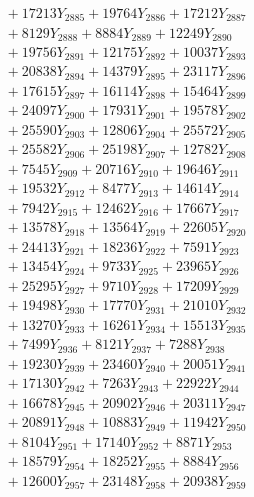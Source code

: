 \documentclass[a4paper,10pt]{article}
\begin{document}
{\begin{align}
&\;  + 17213 Y_{2885} + 19764 Y_{2886} + 17212 Y_{2887} \\[0.3ex]
&\;  + 8129 Y_{2888} + 8884 Y_{2889} + 12249 Y_{2890} \\[0.3ex]
&\;  + 19756 Y_{2891} + 12175 Y_{2892} + 10037 Y_{2893} \\[0.3ex]
&\;  + 20838 Y_{2894} + 14379 Y_{2895} + 23117 Y_{2896} \\[0.3ex]
&\;  + 17615 Y_{2897} + 16114 Y_{2898} + 15464 Y_{2899} \\[0.3ex]
&\;  + 24097 Y_{2900} + 17931 Y_{2901} + 19578 Y_{2902} \\[0.3ex]
&\;  + 25590 Y_{2903} + 12806 Y_{2904} + 25572 Y_{2905} \\[0.3ex]
&\;  + 25582 Y_{2906} + 25198 Y_{2907} + 12782 Y_{2908} \\[0.5ex]\allowbreak
&\;  + 7545 Y_{2909} + 20716 Y_{2910} + 19646 Y_{2911} \\[0.3ex]
&\;  + 19532 Y_{2912} + 8477 Y_{2913} + 14614 Y_{2914} \\[0.3ex]
&\;  + 7942 Y_{2915} + 12462 Y_{2916} + 17667 Y_{2917} \\[0.3ex]
&\;  + 13578 Y_{2918} + 13564 Y_{2919} + 22605 Y_{2920} \\[0.3ex]
&\;  + 24413 Y_{2921} + 18236 Y_{2922} + 7591 Y_{2923} \\[0.3ex]
&\;  + 13454 Y_{2924} + 9733 Y_{2925} + 23965 Y_{2926} \\[0.3ex]
&\;  + 25295 Y_{2927} + 9710 Y_{2928} + 17209 Y_{2929} \\[0.3ex]
&\;  + 19498 Y_{2930} + 17770 Y_{2931} + 21010 Y_{2932} \\[0.3ex]
&\;  + 13270 Y_{2933} + 16261 Y_{2934} + 15513 Y_{2935} \\[0.3ex]
&\;  + 7499 Y_{2936} + 8121 Y_{2937} + 7288 Y_{2938} \\[0.5ex]\allowbreak
&\;  + 19230 Y_{2939} + 23460 Y_{2940} + 20051 Y_{2941} \\[0.3ex]
&\;  + 17130 Y_{2942} + 7263 Y_{2943} + 22922 Y_{2944} \\[0.3ex]
&\;  + 16678 Y_{2945} + 20902 Y_{2946} + 20311 Y_{2947} \\[0.3ex]
&\;  + 20891 Y_{2948} + 10883 Y_{2949} + 11942 Y_{2950} \\[0.3ex]
&\;  + 8104 Y_{2951} + 17140 Y_{2952} + 8871 Y_{2953} \\[0.3ex]
&\;  + 18579 Y_{2954} + 18252 Y_{2955} + 8884 Y_{2956} \\[0.3ex]
&\;  + 12600 Y_{2957} + 23148 Y_{2958} + 20938 Y_{2959} \\[0.3ex]

\end{align}}
\end{document}
